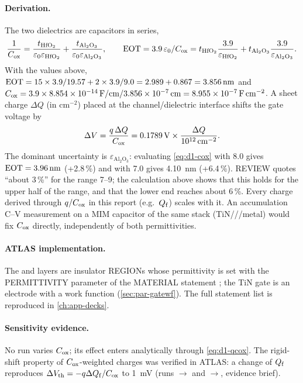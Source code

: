 \paragraph{Derivation.}
The two dielectrics are capacitors in series,
\begin{equation}
  \frac{1}{C_{\mathrm{ox}}} = \frac{t_{\mathrm{HfO_2}}}{\varepsilon_0\varepsilon_{\mathrm{HfO_2}}}
                 + \frac{t_{\mathrm{Al_2O_3}}}{\varepsilon_0\varepsilon_{\mathrm{Al_2O_3}}},
  \qquad
  \mathrm{EOT} = 3.9\,\varepsilon_0/C_{\mathrm{ox}}
       = t_{\mathrm{HfO_2}}\frac{3.9}{\varepsilon_{\mathrm{HfO_2}}} + t_{\mathrm{Al_2O_3}}\frac{3.9}{\varepsilon_{\mathrm{Al_2O_3}}}.
  \label{eq:d1-cox}
\end{equation}
With the values above, $\mathrm{EOT} = 15\times 3.9/19.57 + 2\times 3.9/9.0 = 2.989 + 0.867 = \SI{3.856}{nm}$ and
$C_{\mathrm{ox}} = 3.9\times\SI{8.854e-14}{F/cm}/\SI{3.856e-7}{cm} = \SI{8.955e-7}{\farad\per\centi\metre\squared}$.
A sheet charge $\Delta Q$ (in cm$^{-2}$) placed at the channel/dielectric interface shifts the gate voltage by
\begin{equation}
  \Delta V = \frac{q\,\Delta Q}{C_{\mathrm{ox}}} = \SI{0.1789}{V}\times\frac{\Delta Q}{10^{12}\,\mathrm{cm}^{-2}}.
  \label{eq:d1-qcox}
\end{equation}
The dominant uncertainty is $\varepsilon_{\mathrm{Al_2O_3}}$: evaluating \cref{eq:d1-cox} with 8.0 gives
$\mathrm{EOT} = \SI{3.96}{nm}$ (+2.8\,\%) and with 7.0 gives \SI{4.10}{nm} (+6.4\,\%). REVIEW quotes ``about 3\,\%''
for the range 7--9; the calculation above shows that this holds for the upper half of the range, and that
the lower end reaches about 6\,\%. Every charge derived through $q/C_{\mathrm{ox}}$ in this report (e.g.\ $Q_{\mathrm{f}}$) scales with it.
An accumulation C--V measurement on a MIM capacitor of the same stack (TiN/\HfO/\AlO/metal)
would fix $C_{\mathrm{ox}}$ directly, independently of both permittivities.

\paragraph{ATLAS implementation.}
The \HfO{} and \AlO{} layers are insulator REGIONs whose permittivity is set with the PERMITTIVITY parameter of
the MATERIAL statement \citep[p.~1340]{AtlasManual}; the TiN gate is an electrode with a work function
(\cref{sec:par-gatewf}). The full statement list is reproduced in \cref{ch:app-decks}.

\paragraph{Sensitivity evidence.}
No run varies $C_{\mathrm{ox}}$; its effect enters analytically through \cref{eq:d1-qcox}. The rigid-shift property of
$C_{\mathrm{ox}}$-weighted charges was verified in ATLAS: a change of $Q_{\mathrm{f}}$ reproduces $\Delta V_{\mathrm{th}} = -q\Delta Q_{\mathrm{f}}/C_{\mathrm{ox}}$
to \SI{1}{mV} (runs $\rightarrow$ and $\rightarrow$, evidence brief).

